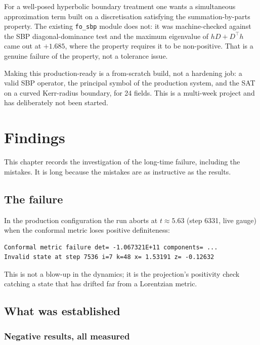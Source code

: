 \documentclass[11pt,openany]{book}
\begin{document}
\label{sec:sbp}

For a well-posed hyperbolic boundary treatment one wants a simultaneous
approximation term built on a discretisation satisfying the summation-by-parts
property. The existing \texttt{fo\_sbp} module does not: it was machine-checked
against the SBP diagonal-dominance test and the maximum eigenvalue of
$hD + D^\top h$ came out at $+1.685$, where the property requires it to be
non-positive. That is a genuine failure of the property, not a tolerance
issue.

Making this production-ready is a from-scratch build, not a hardening job: a
valid SBP operator, the principal symbol of the production system, and the
SAT on a curved Kerr-radius boundary, for 24 fields. This is a multi-week
project and has deliberately not been started.

\chapter{Findings}
\label{ch:findings}

This chapter records the investigation of the long-time failure, including the
mistakes. It is long because the mistakes are as instructive as the results.

\section{The failure}

In the production configuration the run aborts at $t \approx 5.63$
(step 6331, live gauge) when the conformal metric loses positive definiteness:
\begin{lstlisting}
Conformal metric failure det= -1.067321E+11 components= ...
Invalid state at step 7536 i=7 k=48 x= 1.53191 z= -0.12632
\end{lstlisting}
This is not a blow-up in the dynamics; it is the projection's positivity check
catching a state that has drifted far from a Lorentzian metric.

\section{What was established}

\subsection{Negative results, all measured}
\end{document}
